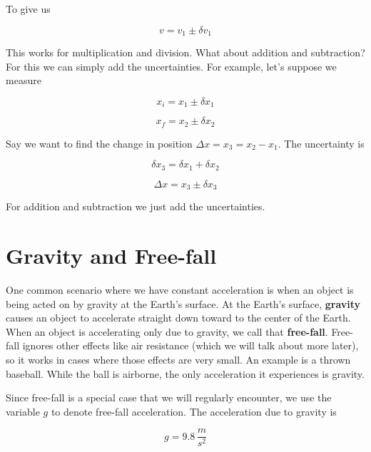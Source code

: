 \documentclass[12pt]{book}
\begin{document}
To give us 

\begin{equation}
v = v_1 \pm \delta v_1
\end{equation}

This works for multiplication and division. What about addition and subtraction? For this we can simply add the uncertainties. For example, let's suppose we measure 

\begin{equation}
x_i = x_1 \pm \delta x_1
\end{equation} 

\begin{equation}
x_f = x_2 \pm \delta x_2
\end{equation}

Say we want to find the change in position $\Delta x = x_3 = x_2 - x_1$. The uncertainty is

\begin{equation}
\delta x_3 = \delta x_1 + \delta x_2
\end{equation}

\begin{equation}
\Delta x = x_3 \pm \delta x_3
\end{equation}

For addition and subtraction we just add the uncertainties.

\section{Gravity and Free-fall}
\label{gravsec}

One common scenario where we have constant acceleration is when an object is being acted on by gravity at the Earth's surface. At the Earth's surface, \textbf{gravity} causes an object to accelerate straight down toward to the center of the Earth. When an object is accelerating only due to gravity, we call that \textbf{free-fall}. Free-fall ignores other effects like air resistance (which we will talk about more later), so it works in cases where those effects are very small. An example is a thrown baseball. While the ball is airborne, the only acceleration it experiences is gravity. 

Since free-fall is a special case that we will regularly encounter, we use the variable $g$ to denote free-fall acceleration. The acceleration due to gravity is 

\begin{equation}
g = 9.8 \, \frac{m}{s^2}
\end{equation}
\end{document}

